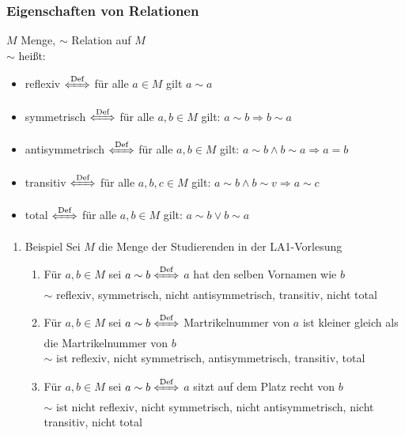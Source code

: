 \documentclass[11pt]{article}
\begin{document}
\subsubsection{Eigenschaften von Relationen}
\label{sec-2-5-2}
$M$ Menge, $\sim$ Relation auf $M$ \\
    $\sim$ heißt:
\begin{itemize}
\item reflexiv $\xLeftrightarrow{\text{Def}}$ für alle $a\in M$ gilt $a\sim a$
\item symmetrisch $\xLeftrightarrow{\text{Def}}$ für alle $a,b\in M$ gilt: $a\sim b \Rightarrow b\sim a$
\item antisymmetrisch $\xLeftrightarrow{\text{Def}}$ für alle $a,b \in M$ gilt: $a\sim b \wedge b\sim a \Rightarrow a = b$
\item transitiv $\xLeftrightarrow{\text{Def}}$ für alle $a,b,c\in M$ gilt: $a\sim b \wedge b\sim v \Rightarrow a\sim c$
\item total $\xLeftrightarrow{\text{Def}}$ für alle $a,b\in M$ gilt: $a\sim b \vee b\sim a$
\end{itemize}
\begin{enumerate}
\item Beispiel
\label{sec-2-5-2-1}
Sei $M$ die Menge der Studierenden in der LA1-Vorlesung
\begin{enumerate}
\item Für $a,b \in M$ sei $a\sim b \xLeftrightarrow{\text{Def}}$ $a$ hat den selben Vornamen wie $b$ \\
        $\sim$ reflexiv, symmetrisch, nicht antisymmetrisch, transitiv, nicht total
\item Für $a,b \in M$ sei $a\sim b \xLeftrightarrow{\text{Def}}$ Martrikelnummer von $a$ ist kleiner gleich als die Martrikelnummer von $b$ \\
        $\sim$ ist reflexiv, nicht symmetrisch, antisymmetrisch, transitiv, total
\item Für $a,b \in M$ sei $a\sim b \xLeftrightarrow{\text{Def}}$ $a$ sitzt auf dem Platz recht von $b$ \\
        $\sim$ ist nicht reflexiv, nicht symmetrisch, nicht antisymmetrisch, nicht transitiv, nicht total
\end{enumerate}
\end{enumerate}
\end{document}

